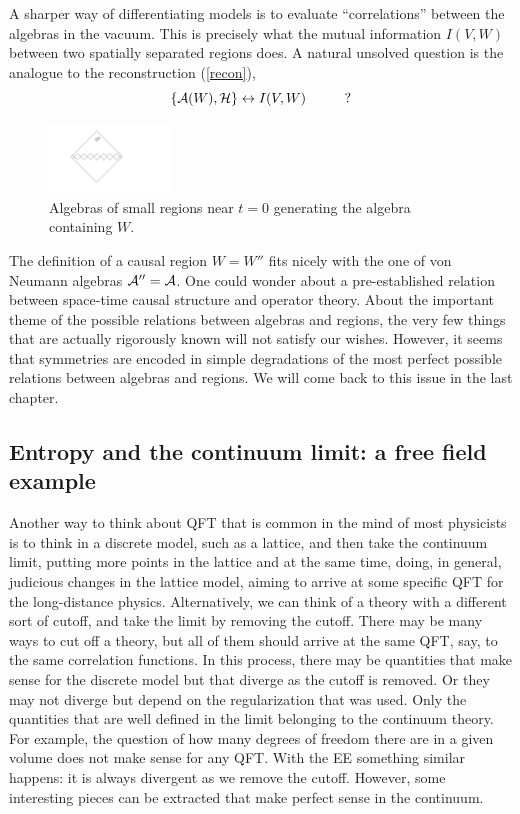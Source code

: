 \documentclass[12pt]{article}
\numberwithin{equation}{section}
\newcommand{\be}{\begin{equation}}
\newcommand{\ee}{\end{equation}}
\begin{document}
A sharper way of differentiating models is to evaluate ``correlations'' between the algebras in the vacuum. This is precisely what the mutual information $I(V,W)$ between two spatially separated regions does. A natural unsolved question is the analogue to the reconstruction (\ref{recon}),
\be
\{{\cal A}(W), {\cal H}\}\leftrightarrow I(V,W) \hspace{1cm}?  
\ee

\begin{figure}[t]
\begin{center}  
\includegraphics[width=0.29\textwidth]{causal1.pdf}
\captionsetup{width=0.9\textwidth}
\caption{Algebras of small regions near $t=0$ generating the algebra containing $W$.}
\label{causal1}
\end{center}  
\end{figure}

The definition of a causal region $W=W''$ fits nicely with the one of von Neumann algebras ${\cal A}''={\cal A}$.  One could wonder about a pre-established relation between space-time causal structure and operator theory. About the important theme of the possible relations between algebras and regions, the very few things that are actually rigorously known will not satisfy our wishes. However, it seems that symmetries are encoded in simple degradations of the most perfect possible relations between algebras and regions. We will come back to this issue in the last chapter.    

\subsection{Entropy and the continuum limit: a free field example}

Another way to think about QFT that is common in the mind of most physicists is to think in a discrete model, such as a lattice, and then take the continuum limit, putting more points in the lattice and at the same time, doing, in general, judicious changes in the lattice model,  aiming to arrive at some specific QFT for the long-distance physics. Alternatively, we can think of a theory with a different sort of cutoff, and take the limit by removing the cutoff. There may be many ways to cut off a theory, but all of them should arrive at the same QFT, say, to the same correlation functions. In this process, there may be quantities that make sense for the discrete model but that diverge as the cutoff is removed. Or they may not diverge but depend on the regularization that was used. Only the quantities that are well defined in the limit belonging to the continuum theory. For example, the question of how many degrees of freedom there are in a given volume does not make sense for any QFT. With the EE something similar happens: it is always divergent as we remove the cutoff. However, some interesting pieces can be extracted that make perfect sense in the continuum.    
\end{document}
